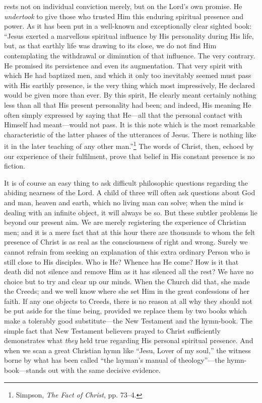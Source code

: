 \documentclass[12pt,a5paper,oneside]{book}
\begin{document}
rests not on individual conviction merely, but
on the Lord's own promise. He \textit{undertook} to
give those who trusted Him this enduring
spiritual presence and power. As it has been
put in a well-known and exceptionally clear
sighted book: ``Jesus exerted a marvellous
spiritual influence by His personality during
His life, but, as that earthly life was drawing
to its close, we do not find Him contemplating
the withdrawal or diminution of that influence.
The very contrary. He promised its persistence 
and even its augmentation. That very
spirit with which He had baptized men, and
which it only too inevitably seemed must pass
with His earthly presence, is the very thing
which most impressively, He declared would be
given more than ever. By this spirit, He
clearly meant certainly nothing less than all
that His present personality had been; and
indeed, His meaning He often simply expressed
by saying that He---all that the personal contact 
with Himself had meant---would not pass.
It is this note which is the most remarkable
characteristic of the latter phases of the utterances 
of Jesus. There is nothing like it in
the later teaching of any other man.''\footnote{Simpson, \textit{The Fact of Christ}, pp. 73--4.}
The
words of Christ, then, echoed by our experience
of their fulfilment, prove that belief in His
constant presence is no fiction.

It is of course an easy thing to ask difficult
philosophic questions regarding the abiding
nearness of the Lord. A child of three will
often ask questions about God and man, heaven
and earth, which no living man can solve;
when the mind is dealing with an infinite
object, it will always be so. But these subtler
problems lie beyond our present aim. We are
merely registering the experience of Christian
men; and it is a mere fact that at this hour
there are thousands to whom the felt presence
of Christ is as real as the consciousness of
right and wrong. Surely we cannot refrain
from seeking an explanation of this extra
ordinary Person who is still close to His disciples. 
Who is He? Whence has He come?
How is it that death did not silence and remove
Him as it has silenced all the rest? We have
no choice but to try and clear up our minds.
When the Church did that, she made the
Creeds; and we well know where she set Him
in the great confessions of her faith. If any
one objects to Creeds, there is no reason at all
why they should not be put aside for the time
being, provided we replace them by two books
which make a tolerably good substitute---the
New Testament and the hymn-book. The
simple fact that New Testament believers
prayed to Christ sufficiently demonstrates what
\textit{they} held true regarding His personal spiritual
presence. And when we scan a great Christian
hymn like ``Jesu, Lover of my soul,'' the witness
borne by what has been called ``the layman's
manual of theology''---the hymn-book---stands
out with the same decisive evidence.
\end{document}
